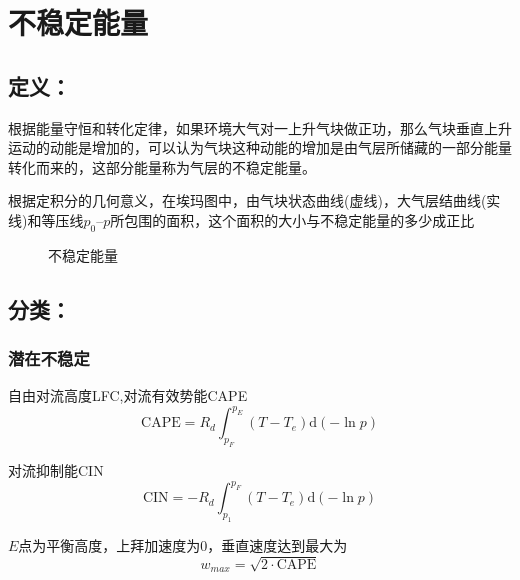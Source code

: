 \documentclass[UTF8,a4paper,11pt,oneside]{ctexbook}
\begin{document}
\section{不稳定能量}

\subsection{定义：}

根据能量守恒和转化定律，如果环境大气对一上升气块做正功，那么气块垂直上升运动的动能是增加的，可以认为气块这种动能的增加是由气层所储藏的一部分能量转化而来的，这部分能量称为气层的不稳定能量。

根据定积分的几何意义，在埃玛图中，由气块状态曲线(虚线)，大气层结曲线(实线)和等压线\(p_0\)--\(p\)所包围的面积，这个面积的大小与不稳定能量的多少成正比
\begin{figure}[htbp]
    \centering
    \caption{不稳定能量}
\end{figure}

\subsection{分类：}
\subsubsection{潜在不稳定}
自由对流高度LFC,对流有效势能CAPE
\begin{equation}
\mathrm{CAPE}=R_d\int_{p_F}^{p_E}(T-T_e)\mathrm{d}(-\ln{}p)
\end{equation}

对流抑制能CIN
\begin{equation}
\mathrm{CIN}=-R_d\int_{p_1}^{p_F}(T-T_e)\mathrm{d}(-\ln{}p)
\end{equation}

\(E\)点为平衡高度，上拜加速度为0，垂直速度达到最大为
\begin{equation}
w_{max}=\sqrt{2\cdot{{}\mathrm{CAPE}}}
\end{equation}
\end{document}
